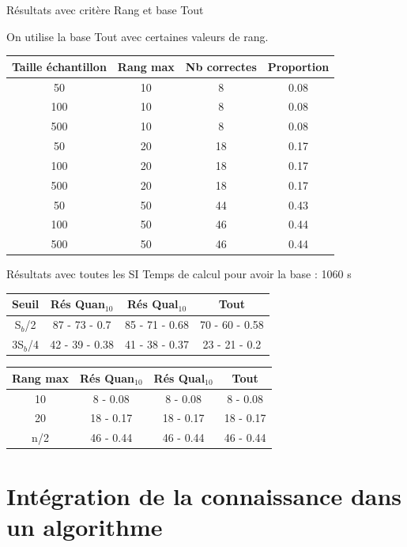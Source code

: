 \documentclass{beamer}
\begin{document}
\begin{frame}{Résultats avec critère Rang et base Tout}

On utilise la base Tout avec certaines valeurs de rang.
\begin{tabular}{|c|c|c|c|}
   \hline
   Taille échantillon & Rang max & Nb correctes & Proportion\\
   \hline
   50 & 10  & 8 & 0.08  \\
   \hline
   100 & 10  & 8 & 0.08  \\
   \hline
   500 & 10  & 8 & 0.08  \\
   \hline
   \hline
   50 & 20  & 18 & 0.17  \\
   \hline
   100 & 20 & 18 & 0.17  \\
   \hline
   500 & 20 & 18 & 0.17  \\
   \hline
   \hline
   50 & 50 & 44 & 0.43  \\
   \hline
   100 & 50 & 46 & 0.44  \\
   \hline
   500 & 50 & 46 & 0.44  \\
   \hline
\end{tabular}
\end{frame}


\begin{frame}{Résultats avec toutes les SI}
Temps de calcul pour avoir la base : 1060 s

\centering
\begin{tabular}{|c|c|c|c|}
   \hline
   Seuil & Rés Quan$_{10}$ & Rés Qual$_{10}$ & Tout \\
   \hline
   S$_{b}$/2 & 87 - 73 - 0.7 & 85 - 71 - 0.68 & 70 - 60 - 0.58 \\
   \hline
   3S$_{b}$/4 & 42 - 39 - 0.38 & 41 - 38 - 0.37  & 23 - 21 - 0.2 \\
   \hline
\end{tabular}

\begin{tabular}{|c|c|c|c|}
   \hline
   Rang max & Rés Quan$_{10}$ & Rés Qual$_{10}$ & Tout \\
   \hline
   10 & 8 - 0.08 & 8 - 0.08 & 8 - 0.08 \\
   \hline
   20 & 18 - 0.17 & 18 - 0.17 & 18 - 0.17 \\
   \hline
   n/2 & 46 - 0.44 & 46 - 0.44 & 46 - 0.44 \\
   \hline
\end{tabular}

\end{frame}

\section{Intégration de la connaissance dans un algorithme}
\end{document}
